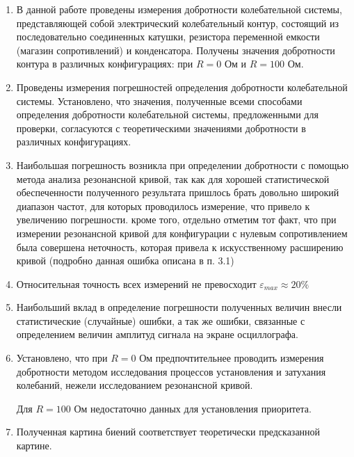 \documentclass[10pt,a4paper]{article}
\begin{document}
	\begin{enumerate}
		\item В данной работе проведены измерения добротности колебательной системы, представляющей собой электрический колебательный контур, состоящий из последовательно соединенных катушки, резистора переменной емкости (магазин сопротивлений) и конденсатора. Получены значения добротности контура в различных конфигурациях: при $R = 0$ Ом и $R = 100$ Ом.
		\item Проведены измерения погрешностей определения добротности колебательной системы. Установлено, что значения, полученные всеми способами определения добротности колебательной системы, предложенными для проверки, согласуются с теоретическими значениями добротности в различных конфигурациях.
		\item Наибольшая погрешность возникла при определении добротности с помощью метода анализа резонансной кривой, так как для хорошей статистической обеспеченности полученного результата пришлось брать довольно широкий диапазон частот, для которых проводилось измерение, что привело к увеличению погрешности. кроме того, отдельно отметим тот факт, что при измерении резонансной кривой для конфигурации с нулевым сопротивлением была совершена неточность, которая привела к искусственному расширению кривой (подробно данная ошибка описана в п. 3.1)
		\item Относительная точность всех измерений не превосходит $\varepsilon_{max} \approx 20 \%$
		\item Наибольший вклад в определение погрешности полученных величин внесли статистические (случайные) ошибки, а так же ошибки, связанные с определением величин амплитуд сигнала на экране осциллографа.
		\item Установлено, что при $R = 0$ Ом предпочтительнее проводить измерения добротности методом исследования процессов установления и затухания колебаний, нежели исследованием резонансной кривой. 
		
		Для $R = 100$ Ом недостаточно данных для установления приоритета.
		\item Полученная картина биений соответствует теоретически предсказанной картине.
	\end{enumerate}


	
\end{document}
